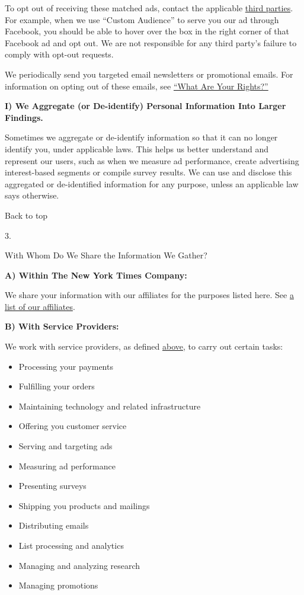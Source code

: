 To opt out of receiving these matched ads, contact the applicable
\href{/privacy/third-party}{third parties}. For example, when we use
``Custom Audience'' to serve you our ad through Facebook, you should be
able to hover over the box in the right corner of that Facebook ad and
opt out. We are not responsible for any third party's failure to comply
with opt-out requests.

We periodically send you targeted email newsletters or promotional
emails. For information on opting out of these emails, see
\protect\hyperlink{anchor-question4}{``What Are Your Rights?''}

\textbf{I) We Aggregate (or De-identify) Personal Information Into
Larger Findings.}

Sometimes we aggregate or de-identify information so that it can no
longer identify you, under applicable laws. This helps us better
understand and represent our users, such as when we measure ad
performance, create advertising interest-based segments or compile
survey results. We can use and disclose this aggregated or de-identified
information for any purpose, unless an applicable law says otherwise.

Back to top

3.

With Whom Do We Share the Information We Gather?

\textbf{A) Within The New York Times Company:}

We share your information with our affiliates for the purposes listed
here. See
\href{https://help.nytimes3xbfgragh.onion/hc/en-us/articles/360004990014}{a
list of our affiliates}.

\textbf{B) With Service Providers:}

We work with service providers, as defined
\protect\hyperlink{anchor-question2-sectionE}{above}, to carry out
certain tasks:

\begin{itemize}
\tightlist
\item
  Processing your payments
\item
  Fulfilling your orders
\item
  Maintaining technology and related infrastructure
\item
  Offering you customer service
\item
  Serving and targeting ads
\item
  Measuring ad performance
\item
  Presenting surveys
\item
  Shipping you products and mailings
\item
  Distributing emails
\item
  List processing and analytics
\item
  Managing and analyzing research
\item
  Managing promotions
\end{itemize}

